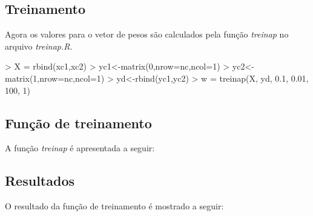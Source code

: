 \documentclass{article}
\begin{document}
\subsection{Treinamento}

Agora os valores para o vetor de pesos são calculados pela função \emph{treinap} no arquivo \emph{treinap.R}.

\begin{Schunk}
\begin{Sinput}
>   X = rbind(xc1,xc2)
>   yc1<-matrix(0,nrow=nc,ncol=1)
>   yc2<-matrix(1,nrow=nc,ncol=1)
>   yd<-rbind(yc1,yc2)
>   w = treinap(X, yd, 0.1, 0.01, 100, 1)
\end{Sinput}
\end{Schunk}

\subsection{Função de treinamento}

A função \emph{treinap} é apresentada a seguir:


\subsection{Resultados}

O resultado da função de treinamento é mostrado a seguir:
\end{document}
